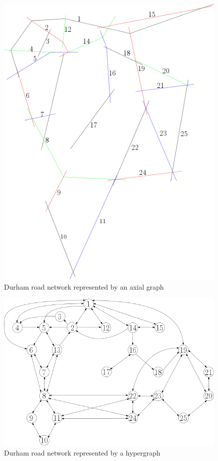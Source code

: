 \documentclass[11pt]{report}
\begin{document}
\begin{figure}[h]
\centering
\includegraphics[width=\linewidth]{axial_colour_label.png}
\caption{Durham road network represented by an axial graph}
\label{fig:durham axial}
\end{figure}

\begin{figure}[h]
\includegraphics[width=\linewidth]{ipe_durham.png}
\caption{Durham road network represented by a hypergraph}
\label{fig:durham graph}
\end{figure}
\end{document}
